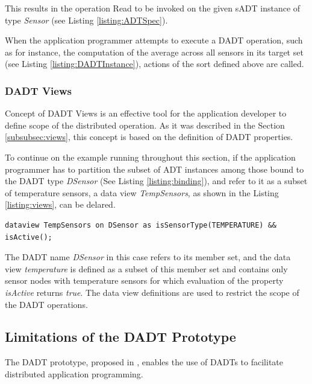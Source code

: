 This results in the operation {Read} to be invoked on the given sADT
instance of type \emph{Sensor} (see Listing \ref{listing:ADTSpec}).

When the application programmer attempts to execute a DADT operation, such as
for instance, the computation of the average
across all sensors in its target set (see Listing \ref{listing:DADTInstance}),
actions of the sort defined above are called. 

\subsubsection{DADT Views} \label{subsubsec:viewsImpl}

Concept of DADT Views is an effective tool for the application developer to
define scope of the distributed operation. As it was described in the Section
\ref{subsubsec:views}, this concept is based on the definition of DADT
properties.

To continue on the example running throughout this section, if the application
programmer has to partition the subset of ADT instances among those bound to the
DADT type \emph{DSensor} (See Listing \ref{listing:binding}), and refer to it
as a subset of temperature sensors, a data view \emph{TempSensors}, 
as shown in the Listing \ref{listing:views}, can be delared.
  
\begin{lstlisting}[frame=trbl, basewidth={0.55em, 0.6em}, captionpos=b, 
basicstyle=\ttfamily\footnotesize, breaklines, caption = Definition of DADT Data View, label = listing:views ]  
dataview TempSensors on DSensor as isSensorType(TEMPERATURE) && isActive(); 
\end{lstlisting}

The DADT name \emph{DSensor} in this case refers to its member set, and 
the data view \emph{temperature} is defined as a subset of this member set and
contains only sensor nodes with temperature sensors for which evaluation of
the property \emph{isActive} returns \emph{true}. The data view definitions are
used to restrict  the scope of the DADT operations.

\subsection{Limitations of the DADT Prototype}

The DADT prototype, proposed in \cite{migliavacca_DADT:2006}, enables the use of
DADTs to facilitate distributed application programming.

